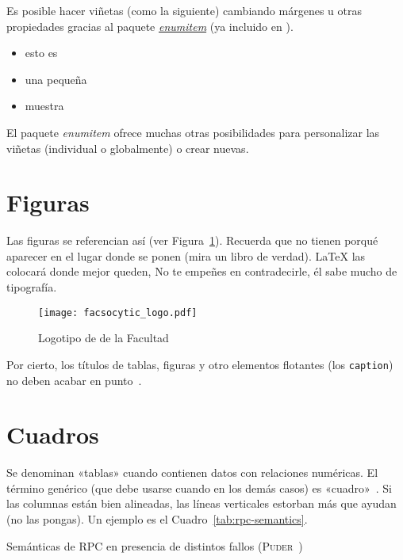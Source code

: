 Es posible hacer viñetas (como la siguiente) cambiando márgenes u otras propiedades gracias al paquete \href{http://mirror.ctan.org/macros/latex/contrib/enumitem/enumitem.pdf}{\emph{enumitem}} (ya incluido en \gitatfg).

\begin{itemize}[noitemsep, label=$\triangleright$]
  \item esto es
  \item una pequeña
  \item muestra
\end{itemize}

El paquete \emph{enumitem} ofrece muchas otras posibilidades para personalizar las viñetas (individual o globalmente) o crear nuevas.


\section{Figuras}

Las figuras se referencian así (ver Figura~\ref{fig:fac}). Recuerda que no tienen porqué aparecer en el lugar donde se ponen (mira un libro de verdad). \LaTeX{} las colocará donde mejor queden, No te empeñes en contradecirle, él sabe mucho de tipografía.

\begin{figure}[!h]
\begin{center}
  \texttt{[image: facsocytic\_logo.pdf]}
  \caption{Logotipo de de la Facultad}
  \label{fig:fac}
\end{center}
\end{figure}

Por cierto, los títulos de tablas, figuras y otro elementos flotantes (los \texttt{caption}) no deben acabar en punto~\cite{sousa}.


\section{Cuadros}
\label{sec:uncuadro}

Se denominan «tablas» cuando contienen datos con relaciones numéricas. El término genérico (que debe usarse cuando en los demás casos) es «cuadro»~\cite{sousa}. Si las columnas están bien alineadas, las líneas verticales estorban más que ayudan (no las pongas). Un ejemplo es el Cuadro~\ref{tab:rpc-semantics}.

\begin{table}[hp]
  \centering
  {\small
  
  }
  \caption[Semánticas de \acs{RPC} en presencia de distintos fallos]{Semánticas de \acs{RPC} en presencia de distintos fallos (\textsc{Puder}~\cite{puder05:_distr_system_archit})}
  \label{tab:rpc-semantics}
\end{table}


